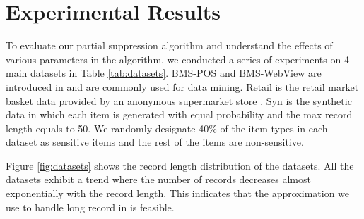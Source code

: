 
\section{Experimental Results}
\label{sec:eval}

To evaluate our partial suppression algorithm and understand the effects of
various parameters in the algorithm, we conducted a series of experiments on
4 main datasets in Table \ref{tab:datasets}. BMS-POS and BMS-WebView are
introduced in \cite{Zheng:2001:RWP:502512.502572} and are commonly used for
data mining. Retail is the retail market basket data provided by an anonymous
supermarket store \cite{brijs99:retailData}. Syn is the synthetic data in
which each item is generated with equal probability and the max record length
equals to 50.
We randomly designate 40\% of the item types in each dataset as
sensitive items and the rest of the items are non-sensitive.

Figure \ref{fig:datasets} shows the record length distribution of the datasets.
All the datasets exhibit a trend where the number of records decreases
almost exponentially with the record length. This indicates that
the approximation we use to handle long record in 
is feasible.


